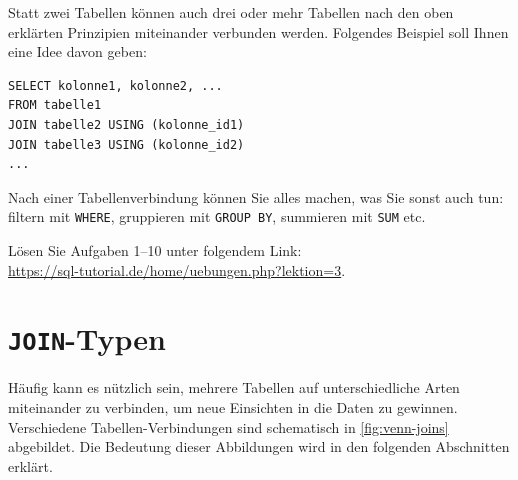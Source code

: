 \begin{myremark}
  Statt zwei Tabellen können auch drei oder mehr Tabellen nach den oben erklärten Prinzipien miteinander verbunden werden. Folgendes Beispiel soll Ihnen eine Idee davon geben:

  \begin{lstlisting}
SELECT kolonne1, kolonne2, ...
FROM tabelle1
JOIN tabelle2 USING (kolonne_id1)
JOIN tabelle3 USING (kolonne_id2)
...
\end{lstlisting}
\end{myremark}

\begin{myremark}
  Nach einer Tabellenverbindung können Sie alles machen, was Sie sonst auch tun: filtern mit \lstinline|WHERE|, gruppieren mit \lstinline|GROUP BY|, summieren mit \lstinline|SUM| etc.
\end{myremark}


\begin{myexercise}
  Lösen Sie Aufgaben 1--10 unter folgendem Link:\\
  \url{https://sql-tutorial.de/home/uebungen.php?lektion=3}.
\end{myexercise}

\section{\texorpdfstring{\lstinline|JOIN|-Typen}{JOIN-Typen}}


Häufig kann es nützlich sein, mehrere Tabellen auf unterschiedliche Arten miteinander zu verbinden, um neue Einsichten in die Daten zu gewinnen. Verschiedene Tabellen-Verbindungen sind schematisch in \cref{fig:venn-joins} abgebildet. Die Bedeutung dieser Abbildungen wird in den folgenden Abschnitten erklärt.


